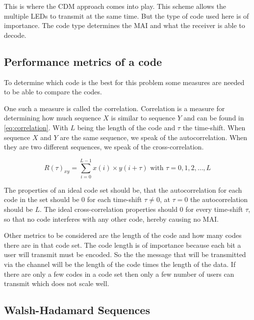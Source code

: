 	This is where the CDM approach comes into play.
	This scheme allows the multiple LEDs to transmit at the same time.
	But the type of code used here is of importance.
	The code type determines the MAI and what the receiver is able to decode.

	\subsection{Performance metrics of a code}
	\label{subsec:performance-metrics}

		To determine which code is the best for this problem some measures are needed to be able to compare the codes.

		One such a measure is called the correlation.
		Correlation is a measure for determining how much sequence $X$ is similar to sequence $Y$ and can be found in \autoref{eq:correlation}.
		With $L$ being the length of the code and $\tau$ the time-shift.
		When sequence $X$ and $Y$ are the same sequence, we speak of the autocorrelation.
		When they are two different sequences, we speak of the cross-correlation. 

		\begin{equation}
			R(\tau)_{xy} = \displaystyle\sum_{i = 0} ^ {L - 1} x(i) \times y(i + \tau) {\text{  with $\tau = 0, 1, 2, \dotsc, L$}}
			\label{eq:correlation}
		\end{equation}

		The properties of an ideal code set should be, that the autocorrelation for each code in the set should be $0$ for each time-shift $\tau \neq 0$, at $\tau = 0$ the autocorrelation should be $L$.
		The ideal cross-correlation properties should $0$ for every time-shift $\tau$, so that no code interferes with any other code, hereby causing no MAI.

		Other metrics to be considered are the length of the code and how many codes there are in that code set.
		The code length is of importance because each bit a user will transmit must be encoded. 
		So the the message that will be transmitted via the channel will be the length of the code times the length of the data.
		If there are only a few codes in a code set then only a few number of users can transmit which does not scale well. 

	\subsection{Walsh-Hadamard Sequences}

